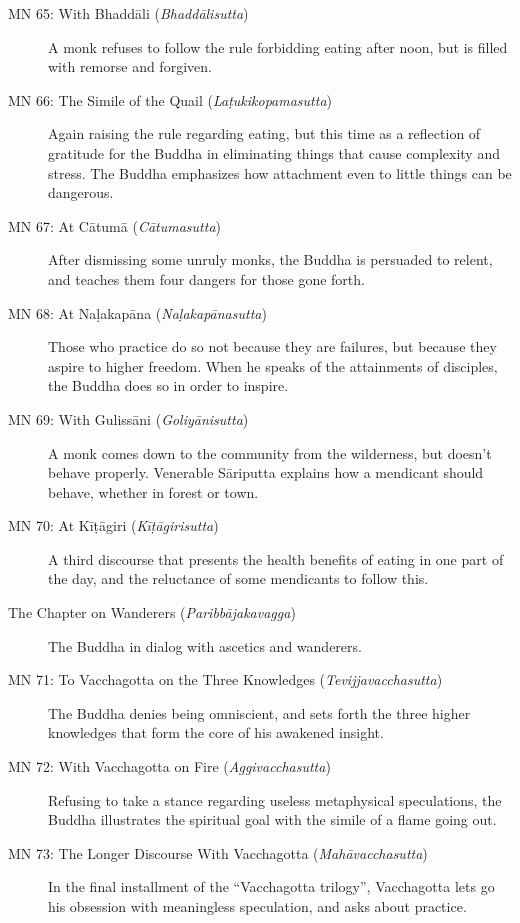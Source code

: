 \documentclass[12pt,openany]{book}%
\begin{document}
\begin{description}
\item[MN 65: With \textsanskrit{Bhaddāli} (\textit{\textsanskrit{Bhaddālisutta}})] A monk refuses to follow the rule forbidding eating after noon, but is filled with remorse and forgiven.%
\item[MN 66: The Simile of the Quail (\textit{\textsanskrit{Laṭukikopamasutta}})] Again raising the rule regarding eating, but this time as a reflection of gratitude for the Buddha in eliminating things that cause complexity and stress. The Buddha emphasizes how attachment even to little things can be dangerous.%
\item[MN 67: At \textsanskrit{Cātumā} (\textit{\textsanskrit{Cātumasutta}})] After dismissing some unruly monks, the Buddha is persuaded to relent, and teaches them four dangers for those gone forth.%
\item[MN 68: At \textsanskrit{Naḷakapāna} (\textit{\textsanskrit{Naḷakapānasutta}})] Those who practice do so not because they are failures, but because they aspire to higher freedom. When he speaks of the attainments of disciples, the Buddha does so in order to inspire.%
\item[MN 69: With \textsanskrit{Gulissāni} (\textit{\textsanskrit{Goliyānisutta}})] A monk comes down to the community from the wilderness, but doesn’t behave properly. Venerable \textsanskrit{Sāriputta} explains how a mendicant should behave, whether in forest or town.%
\item[MN 70: At \textsanskrit{Kīṭāgiri} (\textit{\textsanskrit{Kīṭāgirisutta}})] A third discourse that presents the health benefits of eating in one part of the day, and the reluctance of some mendicants to follow this.%
\item[The Chapter on Wanderers (\textit{\textsanskrit{Paribbājakavagga}})] The Buddha in dialog with ascetics and wanderers.%
\item[MN 71: To Vacchagotta on the Three Knowledges (\textit{\textsanskrit{Tevijjavacchasutta}})] The Buddha denies being omniscient, and sets forth the three higher knowledges that form the core of his awakened insight.%
\item[MN 72: With Vacchagotta on Fire (\textit{\textsanskrit{Aggivacchasutta}})] Refusing to take a stance regarding useless metaphysical speculations, the Buddha illustrates the spiritual goal with the simile of a flame going out.%
\item[MN 73: The Longer Discourse With Vacchagotta (\textit{\textsanskrit{Mahāvacchasutta}})] In the final installment of the “Vacchagotta trilogy”, Vacchagotta lets go his obsession with meaningless speculation, and asks about practice.%

\end{description}
\end{document}
